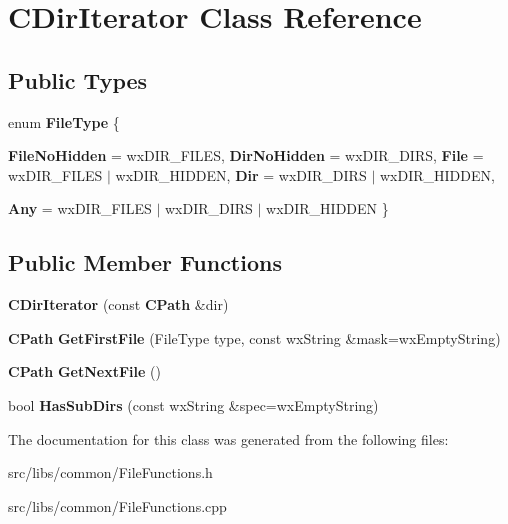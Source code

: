 \section{CDirIterator Class Reference}
\label{classCDirIterator}
\subsection*{Public Types}
\begin{DoxyCompactItemize}
\item 
enum {\bfseries FileType} \{ \par
{\bfseries FileNoHidden} =  wxDIR\_\-FILES, 
{\bfseries DirNoHidden} =  wxDIR\_\-DIRS, 
{\bfseries File} =  wxDIR\_\-FILES $|$ wxDIR\_\-HIDDEN, 
{\bfseries Dir} =  wxDIR\_\-DIRS $|$ wxDIR\_\-HIDDEN, 
\par
{\bfseries Any} =  wxDIR\_\-FILES $|$ wxDIR\_\-DIRS $|$ wxDIR\_\-HIDDEN
 \}
\end{DoxyCompactItemize}
\subsection*{Public Member Functions}
\begin{DoxyCompactItemize}
\item 
{\bfseries CDirIterator} (const {\bf CPath} \&dir)\label{classCDirIterator_a2a2368b03cc928c131eb76443b8be179}

\item 
{\bf CPath} {\bfseries GetFirstFile} (FileType type, const wxString \&mask=wxEmptyString)\label{classCDirIterator_afb14ccaa1370ef03012d4b2bb5aad49b}

\item 
{\bf CPath} {\bfseries GetNextFile} ()\label{classCDirIterator_a6e546380eef033636e5f586eecd6499c}

\item 
bool {\bfseries HasSubDirs} (const wxString \&spec=wxEmptyString)\label{classCDirIterator_abec2fc66d90155cffb049e10f7e6a05a}

\end{DoxyCompactItemize}


The documentation for this class was generated from the following files:\begin{DoxyCompactItemize}
\item 
src/libs/common/FileFunctions.h\item 
src/libs/common/FileFunctions.cpp\end{DoxyCompactItemize}
